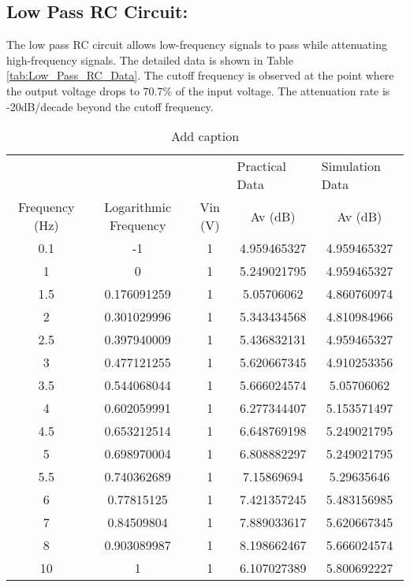 \documentclass[a4paper, 12pt]{extarticle}
\begin{document}
\subsection{Low Pass RC Circuit:}
The low pass RC circuit allows low-frequency signals to pass while attenuating high-frequency signals. The detailed data is shown in Table \ref{tab:Low_Pass_RC_Data}. The cutoff frequency is observed at the point where the output voltage drops to 70.7\% of the input voltage. The attenuation rate is -20dB/decade beyond the cutoff frequency.

\begin{table}[htbp]
  \centering
  \caption{Add caption}
    \begin{tabular}{ccccc}
          &       &       & \multicolumn{1}{l}{Practical Data} & \multicolumn{1}{l}{Simulation Data} \\
    Frequency (Hz) & Logarithmic Frequency & Vin (V) & Av (dB) & Av (dB) \\
    0.1   & -1    & 1     & 4.959465327 & 4.959465327 \\
    1     & 0     & 1     & 5.249021795 & 4.959465327 \\
    1.5   & 0.176091259 & 1     & 5.05706062 & 4.860760974 \\
    2     & 0.301029996 & 1     & 5.343434568 & 4.810984966 \\
    2.5   & 0.397940009 & 1     & 5.436832131 & 4.959465327 \\
    3     & 0.477121255 & 1     & 5.620667345 & 4.910253356 \\
    3.5   & 0.544068044 & 1     & 5.666024574 & 5.05706062 \\
    4     & 0.602059991 & 1     & 6.277344407 & 5.153571497 \\
    4.5   & 0.653212514 & 1     & 6.648769198 & 5.249021795 \\
    5     & 0.698970004 & 1     & 6.808882297 & 5.249021795 \\
    5.5   & 0.740362689 & 1     & 7.15869694 & 5.29635646 \\
    6     & 0.77815125 & 1     & 7.421357245 & 5.483156985 \\
    7     & 0.84509804 & 1     & 7.889033617 & 5.620667345 \\
    8     & 0.903089987 & 1     & 8.198662467 & 5.666024574 \\
    10    & 1     & 1     & 6.107027389 & 5.800692227 \\

\end{tabular}
\end{table}
\end{document}
